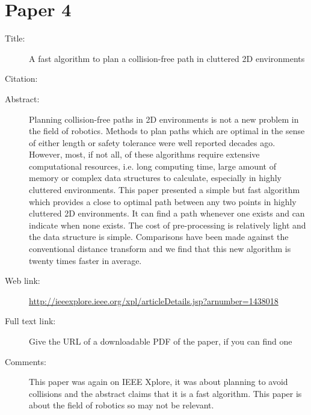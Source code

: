 \documentclass{scrartcl}
\begin{document}
\section*{Paper 4}
\begin{description}
	\item[Title:] 
	A fast algorithm to plan a collision-free path in cluttered 2D environments
	\item[Citation:] \cite{Tang}
	\item[Abstract:] Planning collision-free paths in 2D environments is not a new problem in the field of robotics. Methods to plan paths which are optimal in the sense of either length or safety tolerance were well reported decades ago. However, most, if not all, of these algorithms require extensive computational resources, i.e. long computing time, large amount of memory or complex data structures to calculate, especially in highly cluttered environments. This paper presented a simple but fast algorithm which provides a close to optimal path between any two points in highly cluttered 2D environments. It can find a path whenever one exists and can indicate when none exists. The cost of pre-processing is relatively light and the data structure is simple. Comparisons have been made against the conventional distance transform and we find that this new algorithm is twenty times faster in average.
	\item[Web link:] \url{http://ieeexplore.ieee.org/xpl/articleDetails.jsp?arnumber=1438018}
	\item[Full text link:] Give the URL of a downloadable PDF of the paper, if you can find one
	\item[Comments:] This paper was again on IEEE Xplore, it was about planning to avoid collisions and the abstract claims that it is a fast algorithm. This paper is about the field of robotics so may not be relevant. 
\end{description}
\end{document}
